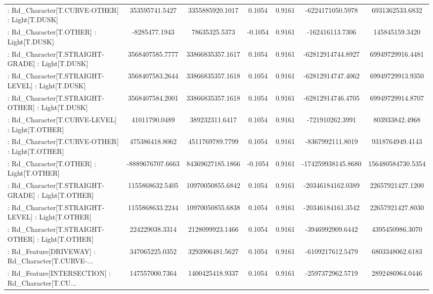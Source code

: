 \begin{longtable}{p{4cm}cccccc}
 : Rd\_Character[T.CURVE-OTHER] : Light[T.DUSK]     &    353595741.5427 &   3355885920.1017 &  0.1054 &       0.9161 &   -6224171050.5978 &   6931362533.6832 \\
 : Rd\_Character[T.OTHER] : Light[T.DUSK]           &     -8285477.1943 &     78635325.5373 & -0.1054 &       0.9161 &    -162416113.7306 &    145845159.3420 \\
 : Rd\_Character[T.STRAIGHT-GRADE] : Light[T.DUSK]  &   3568407585.7777 &  33866835357.1617 &  0.1054 &       0.9161 &  -62812914744.8927 &  69949729916.4481 \\
 : Rd\_Character[T.STRAIGHT-LEVEL] : Light[T.DUSK]  &   3568407583.2644 &  33866835357.1618 &  0.1054 &       0.9161 &  -62812914747.4062 &  69949729913.9350 \\
 : Rd\_Character[T.STRAIGHT-OTHER] : Light[T.DUSK]  &   3568407584.2001 &  33866835357.1618 &  0.1054 &       0.9161 &  -62812914746.4705 &  69949729914.8707 \\
 : Rd\_Character[T.CURVE-LEVEL] : Light[T.OTHER]    &     41011790.0489 &    389232311.6417 &  0.1054 &       0.9161 &    -721910262.3991 &    803933842.4968 \\
 : Rd\_Character[T.CURVE-OTHER] : Light[T.OTHER]    &    475386418.8062 &   4511769789.7799 &  0.1054 &       0.9161 &   -8367992111.8019 &   9318764949.4143 \\
 : Rd\_Character[T.OTHER] : Light[T.OTHER]          &  -8889676707.6663 &  84369627185.1866 & -0.1054 &       0.9161 & -174259938145.8680 & 156480584730.5354 \\
 : Rd\_Character[T.STRAIGHT-GRADE] : Light[T.OTHER] &   1155868632.5405 &  10970050855.6842 &  0.1054 &       0.9161 &  -20346184162.0389 &  22657921427.1200 \\
 : Rd\_Character[T.STRAIGHT-LEVEL] : Light[T.OTHER] &   1155868633.2244 &  10970050855.6838 &  0.1054 &       0.9161 &  -20346184161.3542 &  22657921427.8030 \\
 : Rd\_Character[T.STRAIGHT-OTHER] : Light[T.OTHER] &    224229038.3314 &   2128099923.1466 &  0.1054 &       0.9161 &   -3946992909.6442 &   4395450986.3070 \\
 : Rd\_Feature[DRIVEWAY] : Rd\_Character[T.CURVE-... &    347065225.0352 &   3293906481.5627 &  0.1054 &       0.9161 &   -6109217612.5479 &   6803348062.6183 \\
 : Rd\_Feature[INTERSECTION] : Rd\_Character[T.CU... &    147557000.7364 &   1400425418.9337 &  0.1054 &       0.9161 &   -2597372962.5719 &   2892486964.0446 \\

\end{longtable}
